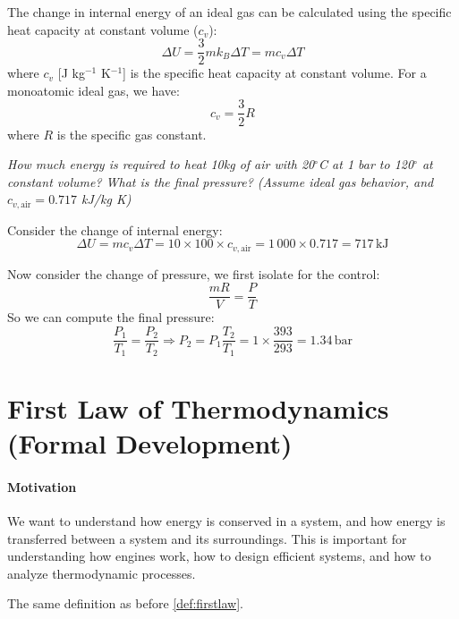 \documentclass[11pt]{report}
\begin{document}
\begin{definition}
    The change in internal energy of an ideal gas can be calculated using the specific heat capacity at constant volume ($c_v$):
    \begin{equation}
        \Delta U = \frac{3}{2} mk_B \Delta T = m c_v \Delta T
    \end{equation}
    where $c_v$ [J kg$^{-1}$ K$^{-1}$] is the specific heat capacity at constant volume. For a monoatomic ideal gas, we have:
    \begin{equation}
        c_v = \frac{3}{2} R
    \end{equation}
    where $R$ is the specific gas constant.
\end{definition}

\begin{example}
    \textit{How much energy is required to heat 10kg of air with 20$^\circ$C at 1 bar to 120$^\circ$ at constant volume? What is the final pressure? (Assume ideal gas behavior, and $c_{v, \text{air}} = 0.717$ kJ/kg K)}

    Consider the change of internal energy:
    $$
        \Delta U = m c_v \Delta T = 10 \times 100 \times c_{v, \text{air}} = 1\,000 \times 0.717 = 717\, \text{kJ}
    $$

    Now consider the change of pressure, we first isolate for the control:
    $$
        \frac{mR}{V} = \frac{P}{T}
    $$
    So we can compute the final pressure:
    $$
        \frac{P_1}{T_1} = \frac{P_2}{T_2} \Rightarrow P_2 = P_1 \frac{T_2}{T_1} = 1 \times \frac{393}{293} = 1.34\, \text{bar}
    $$
\end{example}

\section{First Law of Thermodynamics (Formal Development)}
\begin{shaded}
\paragraph{Motivation} We want to understand how energy is conserved in a system, and how energy is transferred between a system and its surroundings. This is important for understanding how engines work, how to design efficient systems, and how to analyze thermodynamic processes.
\end{shaded}  
The same definition as before \ref{def:firstlaw}.
\end{document}
